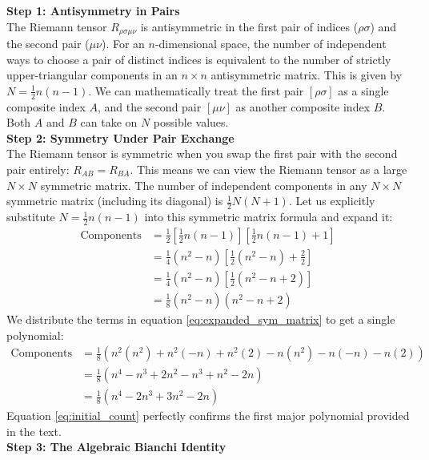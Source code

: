 \documentclass[11pt, a4paper]{report}
\begin{document}
\textbf{Step 1: Antisymmetry in Pairs} \\
The Riemann tensor $R_{\rho\sigma\mu\nu}$ is antisymmetric in the first pair of indices ($\rho\sigma$) and the second pair ($\mu\nu$). For an $n$-dimensional space, the number of independent ways to choose a pair of distinct indices is equivalent to the number of strictly upper-triangular components in an $n \times n$ antisymmetric matrix. This is given by $N = \frac{1}{2}n(n-1)$. We can mathematically treat the first pair $[\rho\sigma]$ as a single composite index $A$, and the second pair $[\mu\nu]$ as another composite index $B$. Both $A$ and $B$ can take on $N$ possible values. \\
\textbf{Step 2: Symmetry Under Pair Exchange} \\
The Riemann tensor is symmetric when you swap the first pair with the second pair entirely: $R_{AB} = R_{BA}$. This means we can view the Riemann tensor as a large $N \times N$ symmetric matrix. The number of independent components in any $N \times N$ symmetric matrix (including its diagonal) is $\frac{1}{2}N(N+1)$. Let us explicitly substitute $N = \frac{1}{2}n(n-1)$ into this symmetric matrix formula and expand it:
\begin{align}
\text{Components} &= \frac{1}{2} \left[ \frac{1}{2}n(n-1) \right] \left[ \frac{1}{2}n(n-1) + 1 \right] \nonumber \\
                  &= \frac{1}{4} (n^2 - n) \left[ \frac{1}{2}(n^2 - n) + \frac{2}{2} \right] \nonumber \\
                  &= \frac{1}{4} (n^2 - n) \left[ \frac{1}{2}(n^2 - n + 2) \right] \nonumber \\
                  &= \frac{1}{8} (n^2 - n) (n^2 - n + 2) \label{eq:expanded_sym_matrix}
\end{align}
We distribute the terms in equation \eqref{eq:expanded_sym_matrix} to get a single polynomial:
\begin{align}
\text{Components} &= \frac{1}{8} \left( n^2(n^2) + n^2(-n) + n^2(2) - n(n^2) - n(-n) - n(2) \right) \nonumber \\
                  &= \frac{1}{8} (n^4 - n^3 + 2n^2 - n^3 + n^2 - 2n) \nonumber \\
                  &= \frac{1}{8} (n^4 - 2n^3 + 3n^2 - 2n) \label{eq:initial_count}
\end{align}
Equation \eqref{eq:initial_count} perfectly confirms the first major polynomial provided in the text. \\
\textbf{Step 3: The Algebraic Bianchi Identity} \\
\end{document}
